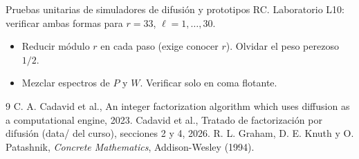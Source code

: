 \documentclass[11pt,a4paper]{article}
\begin{document}
\begin{aplicacion}
Pruebas unitarias de simuladores de difusión y prototipos RC. Laboratorio L10: verificar ambas formas para $r=33$, $\ell=1,\dots,30$.
\end{aplicacion}

\begin{error}
\begin{itemize}[nosep]
\item Reducir módulo $r$ en cada paso (exige conocer $r$). \quad Olvidar el peso perezoso $1/2$.
\item Mezclar espectros de $P$ y $W$. \quad Verificar solo en coma flotante.
\end{itemize}
\end{error}

\begin{thebibliography}{9}\small
{} C. A. Cadavid et al., An integer factorization algorithm which uses diffusion as a computational engine, 2023.
 Cadavid et al., Tratado de factorización por difusión (data/ del curso), secciones 2 y 4, 2026.
 R. L. Graham, D. E. Knuth y O. Patashnik, \emph{Concrete Mathematics}, Addison-Wesley (1994).
\end{thebibliography}
\end{document}
